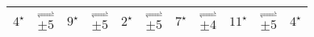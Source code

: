 \documentclass{standalone}
\begin{document}
     \begin{tabular}{||c|c|c|c|c|c|c|c|c|c|c||} 
     \hline
      $4^{\star}$ &  $\stackrel{\rightleftharpoons}{\pm5}$ & $9^{\star}$  & $\stackrel{\rightleftharpoons}{\pm5}$ & $2^{\star}$ & $\stackrel{\rightleftharpoons}{\pm5}$ & $7^{\star}$ & $\stackrel{\rightleftharpoons}{\pm4}$ & $11^{\star}$ & $\stackrel{\rightleftharpoons}{\pm5}$ & $4^{\star}$  \\
     \hline 
  \end{tabular}
\end{document}
